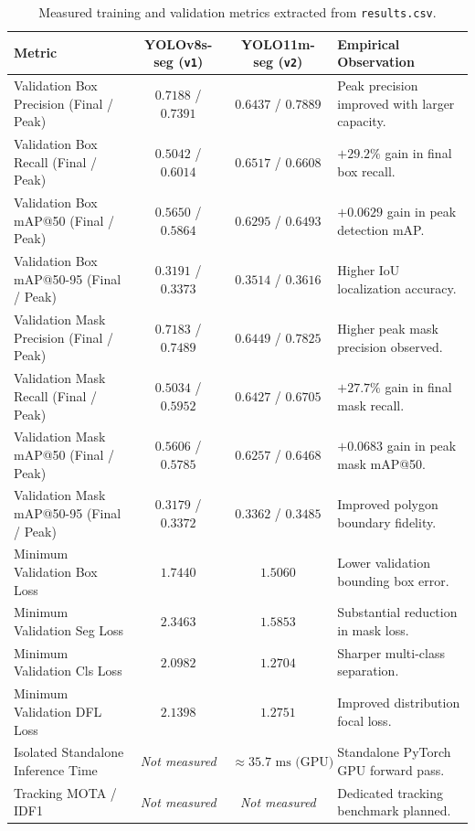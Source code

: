 \documentclass[11pt,a4paper]{article}
\begin{document}
\begin{table}[htbp]
\centering
\small
\caption{Measured training and validation metrics extracted from \texttt{results.csv}.}
\label{tab:experimental_metrics}
\begin{tabularx}{\textwidth}{l c c X}
\toprule
\textbf{Metric} & \textbf{YOLOv8s-seg (\texttt{v1})} & \textbf{YOLO11m-seg (\texttt{v2})} & \textbf{Empirical Observation} \\
\midrule
Validation Box Precision (Final / Peak) & $0.7188$ / $0.7391$ & $0.6437$ / $0.7889$ & Peak precision improved with larger capacity. \\
Validation Box Recall (Final / Peak) & $0.5042$ / $0.6014$ & $\mathbf{0.6517}$ / $\mathbf{0.6608}$ & $\mathbf{+29.2\%}$ gain in final box recall. \\
Validation Box mAP@50 (Final / Peak) & $0.5650$ / $0.5864$ & $\mathbf{0.6295}$ / $\mathbf{0.6493}$ & $+0.0629$ gain in peak detection mAP. \\
Validation Box mAP@50-95 (Final / Peak) & $0.3191$ / $0.3373$ & $\mathbf{0.3514}$ / $\mathbf{0.3616}$ & Higher IoU localization accuracy. \\
\midrule
Validation Mask Precision (Final / Peak) & $0.7183$ / $0.7489$ & $0.6449$ / $0.7825$ & Higher peak mask precision observed. \\
Validation Mask Recall (Final / Peak) & $0.5034$ / $0.5952$ & $\mathbf{0.6427}$ / $\mathbf{0.6705}$ & $\mathbf{+27.7\%}$ gain in final mask recall. \\
Validation Mask mAP@50 (Final / Peak) & $0.5606$ / $0.5785$ & $\mathbf{0.6257}$ / $\mathbf{0.6468}$ & $+0.0683$ gain in peak mask mAP@50. \\
Validation Mask mAP@50-95 (Final / Peak) & $0.3179$ / $0.3372$ & $\mathbf{0.3362}$ / $\mathbf{0.3485}$ & Improved polygon boundary fidelity. \\
\midrule
Minimum Validation Box Loss & $1.7440$ & $\mathbf{1.5060}$ & Lower validation bounding box error. \\
Minimum Validation Seg Loss & $2.3463$ & $\mathbf{1.5853}$ & Substantial reduction in mask loss. \\
Minimum Validation Cls Loss & $2.0982$ & $\mathbf{1.2704}$ & Sharper multi-class separation. \\
Minimum Validation DFL Loss & $2.1398$ & $\mathbf{1.2751}$ & Improved distribution focal loss. \\
\midrule
Isolated Standalone Inference Time & \textit{Not measured} & $\approx 35.7\text{ ms (GPU)}$ & Standalone PyTorch GPU forward pass. \\
Tracking MOTA / IDF1 & \textit{Not measured} & \textit{Not measured} & Dedicated tracking benchmark planned. \\
\bottomrule
\end{tabularx}
\end{table}
\end{document}
